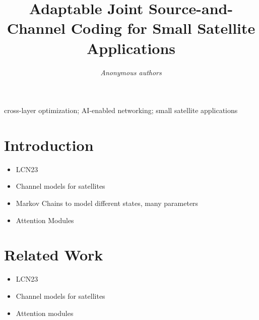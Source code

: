 \documentclass[conference]{IEEEtran}
\begin{document}
\title{Adaptable Joint Source-and-Channel Coding for Small Satellite Applications}

\author{\emph{Anonymous authors}}

\maketitle

\begin{abstract}

\end{abstract}

\begin{IEEEkeywords}
  cross-layer optimization; AI-enabled networking; small satellite applications
  \end{IEEEkeywords}

\acresetall
\section{Introduction}
\begin{itemize}
  \item LCN23
  \item Channel models for satellites
  \item Markov Chains to model different states, many parameters
  \item Attention Modules
\end{itemize}



\section{Related Work}
\label{sec:related_work}
\begin{itemize}
  \item LCN23
  \item Channel models for satellites
  \item Attention modules
\end{itemize}
\end{document}

